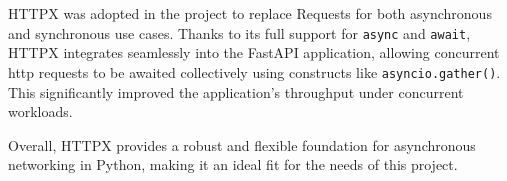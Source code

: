 HTTPX was adopted in the project to replace Requests for both asynchronous and synchronous use cases. Thanks to its full 
support for \texttt{async} and \texttt{await}, HTTPX integrates seamlessly into the FastAPI application, allowing 
concurrent \ac{http} requests to be awaited collectively using constructs like \texttt{asyncio.gather()}. This significantly 
improved the application's throughput under concurrent workloads.

Overall, HTTPX provides a robust and flexible foundation for asynchronous networking in Python, making it an ideal 
fit for the needs of this project.

